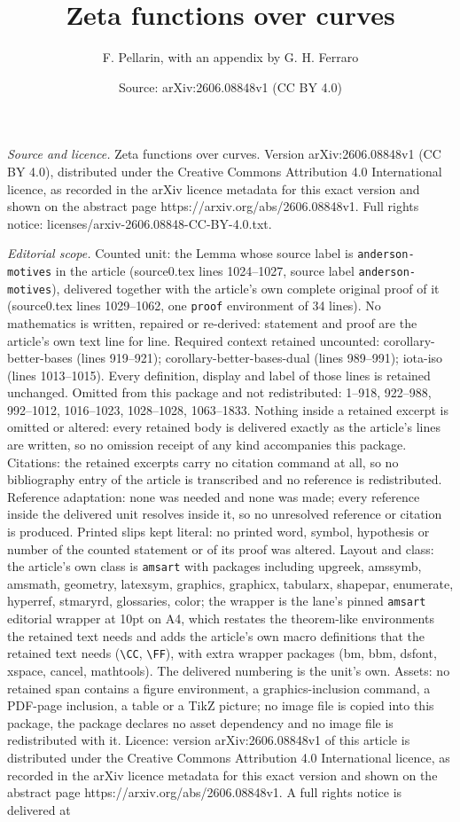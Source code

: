 \documentclass[10pt,a4paper]{amsart}
\title[Zeta functions over curves]{Zeta functions over curves}
\author{F. Pellarin, with an appendix by G. H. Ferraro}
\date{Source: arXiv:2606.08848v1 (CC BY 4.0)}
\begin{document}
\maketitle

\noindent\emph{Source and licence.} Zeta functions over curves. Version arXiv:2606.08848v1 (CC BY 4.0), distributed under the Creative Commons Attribution 4.0 International licence, as recorded in the arXiv licence metadata for this exact version and shown on the abstract page https://arxiv.org/abs/2606.08848v1. Full rights notice: licenses/arxiv-2606.08848-CC-BY-4.0.txt.\par\smallskip

\noindent\textit{Editorial scope.} Counted unit: the Lemma whose source label is \texttt{anderson-motives} in the article (source0.tex lines 1024--1027, source label \texttt{anderson-motives}), delivered together with the article's own complete original proof of it (source0.tex lines 1029--1062, one \texttt{proof} environment of 34 lines). No mathematics is written, repaired or re-derived: statement and proof are the article's own text line for line. Required context retained uncounted: corollary-better-bases (lines 919--921); corollary-better-bases-dual (lines 989--991); iota-iso (lines 1013--1015). Every definition, display and label of those lines is retained unchanged. Omitted from this package and not redistributed: 1--918, 922--988, 992--1012, 1016--1023, 1028--1028, 1063--1833. Nothing inside a retained excerpt is omitted or altered: every retained body is delivered exactly as the article's lines are written, so no omission receipt of any kind accompanies this package. Citations: the retained excerpts carry no citation command at all, so no bibliography entry of the article is transcribed and no reference is redistributed. Reference adaptation: none was needed and none was made; every reference inside the delivered unit resolves inside it, so no unresolved reference or citation is produced. Printed slips kept literal: no printed word, symbol, hypothesis or number of the counted statement or of its proof was altered. Layout and class: the article's own class is \texttt{amsart} with packages including upgreek, amssymb, amsmath, geometry, latexsym, graphics, graphicx, tabularx, shapepar, enumerate, hyperref, stmaryrd, glossaries, color; the wrapper is the lane's pinned \texttt{amsart} editorial wrapper at 10pt on A4, which restates the theorem-like environments the retained text needs and adds the article's own macro definitions that the retained text needs (\texttt{\textbackslash CC}, \texttt{\textbackslash FF}), with extra wrapper packages (bm, bbm, dsfont, xspace, cancel, mathtools). The delivered numbering is the unit's own. Assets: no retained span contains a figure environment, a graphics-inclusion command, a PDF-page inclusion, a table or a TikZ picture; no image file is copied into this package, the package declares no asset dependency and no image file is redistributed with it. Licence: version arXiv:2606.08848v1 of this article is distributed under the Creative Commons Attribution 4.0 International licence, as recorded in the arXiv licence metadata for this exact version and shown on the abstract page https://arxiv.org/abs/2606.08848v1. A full rights notice is delivered at 
\end{document}
